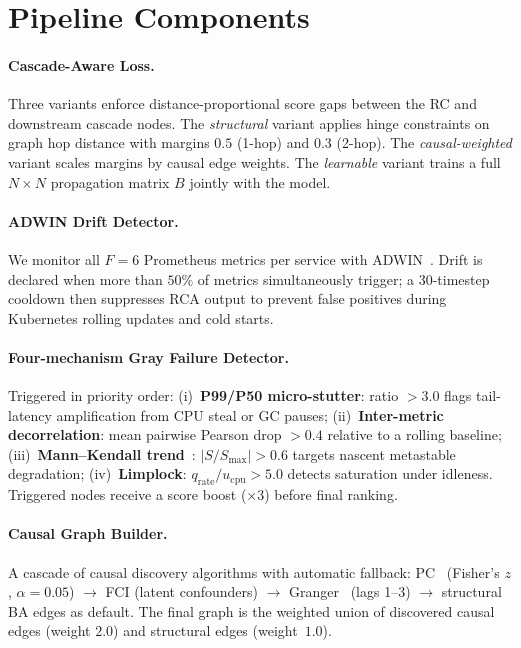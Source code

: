 \documentclass[11pt,a4paper]{article}
\begin{document}
\section{Pipeline Components}
\label{sec:ops}

\paragraph{Cascade-Aware Loss.}
\label{sec:cascade}
Three variants enforce distance-proportional score gaps between the RC and
downstream cascade nodes. The \emph{structural} variant applies hinge
constraints on graph hop distance with margins $0.5$ (1-hop) and $0.3$
(2-hop). The \emph{causal-weighted} variant scales margins by causal edge
weights. The \emph{learnable} variant trains a full $N{\times}N$ propagation
matrix $B$ jointly with the model.

\paragraph{ADWIN Drift Detector.}
We monitor all $F{=}6$ Prometheus metrics per service with
ADWIN~\cite{bifet2007adwin}. Drift is declared when more than $50\%$ of
metrics simultaneously trigger; a 30-timestep cooldown then suppresses RCA
output to prevent false positives during Kubernetes rolling updates and
cold starts.

\paragraph{Four-mechanism Gray Failure Detector.}
Triggered in priority order:
(i)~\textbf{P99/P50 micro-stutter}: ratio $\!>\!3.0$ flags tail-latency
amplification from CPU steal or GC pauses;
(ii)~\textbf{Inter-metric decorrelation}: mean pairwise Pearson drop
$\!>\!0.4$ relative to a rolling baseline;
(iii)~\textbf{Mann--Kendall trend}~\cite{mann1945mk}: $|S/S_{\max}|\!>\!0.6$
targets nascent metastable degradation;
(iv)~\textbf{Limplock}: $q_{\mathrm{rate}}/u_{\mathrm{cpu}}\!>\!5.0$ detects
saturation under idleness.
Triggered nodes receive a score boost ($\times 3$) before final ranking.

\paragraph{Causal Graph Builder.}
A cascade of causal discovery algorithms with automatic fallback:
PC~\cite{spirtes2000causation} (Fisher's $z$, $\alpha\!=\!0.05$)
$\rightarrow$ FCI (latent confounders)
$\rightarrow$ Granger~\cite{granger1969} (lags 1--3)
$\rightarrow$ structural BA edges as default. The final graph is the weighted
union of discovered causal edges (weight $2.0$) and structural edges
(weight~$1.0$).
\end{document}
